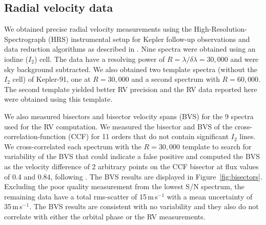 \documentclass[apjl]{emulateapj}
\begin{document}
\subsection{Radial velocity data}
We obtained precise radial velocity measurements using the High-Resolution-Spectrograph (HRS) \citep{tull98}
instrumental setup for Kepler follow-up observations and data reduction algorithms as described in \citet{endl11}. Nine spectra were obtained using an iodine ($I_2$) cell. The data have a resolving power of $R = \lambda/\delta\lambda = 30,000$ and were sky background subtracted. We also obtained two template spectra (without the $I_2$ cell) of Kepler-91, one at $R=30,000$ and a second spectrum with $R=60,000$. The second template yielded better RV precision and the RV data reported here were obtained using this template.

We also measured bisectors and bisector velocity spans (BVS) for the 9 spectra used for the RV computation. We measured the bisector and BVS of the cross-correlation-function (CCF) for 11 orders that do not contain significant $I_2$ lines. We cross-correlated each spectrum with the $R=30,000$ template to search for variability of the BVS that could indicate a false positive and computed the BVS as the velocity difference of 2 arbitrary points on the CCF bisector at flux values of 0.4 and 0.84, following \citet{hatzes98}. The BVS results are displayed in Figure~\ref{fig:bisectors}. Excluding the poor
quality measurement from the lowest S/N spectrum, the remaining data have a total rms-scatter of 15\,m\,s$^{-1}$ with a mean uncertainty of 35\,m\,s$^{-1}$. The BVS results are consistent with no variability and they also do not correlate with either the orbital phase or the RV measurements.



\end{document}
